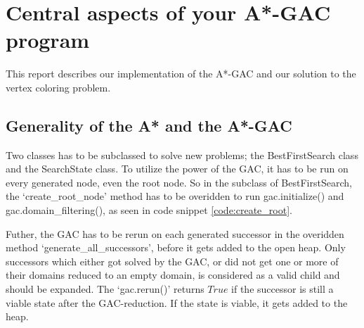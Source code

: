 
\section{Central aspects of your A*-GAC program}
This report describes our implementation of the A*-GAC and our solution to the vertex coloring problem.

\subsection{Generality of the A* and the A*-GAC}
Two classes has to be subclassed to solve new problems; the BestFirstSearch class and the SearchState class. To utilize the power of the GAC, it has to be run on every generated node, even the root node. So in the subclass of BestFirstSearch, the `create\_root\_node' method has to be overidden to run gac.initialize() and gac.domain\_filtering(), as seen in code snippet \ref{code:create_root}.



Futher, the GAC has to be rerun on each generated successor in the overidden method `generate\_all\_successors', before it gets added to the open heap. Only successors which either got solved by the GAC, or did not get one or more of their domains reduced to an empty domain, is considered as a valid child and should be expanded. The `gac.rerun()' returns \(True\) if the successor is still a viable state after the GAC-reduction. If the state is viable, it gets added to the heap.

